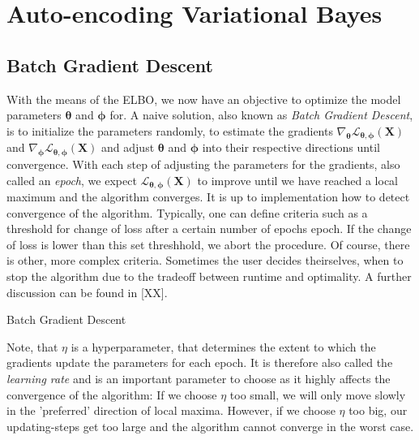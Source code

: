 \documentclass[12pt]{report}
\theoremstyle{definition}
\begin{document}
\section{Auto-encoding Variational Bayes}
\subsection{Batch Gradient Descent}
With the means of the ELBO, we now have an objective to optimize the model parameters $\pmb{\theta}$ and $\pmb{\phi}$ for. A naive solution, also known as \emph{Batch Gradient Descent}, is to initialize the parameters randomly, to estimate the gradients $\nabla_{\pmb{\theta}}\mathcal{L}_{\pmb{\theta}, \pmb{\phi}}(\mathbf{X})$ and $\nabla_{\pmb{\pmb{\phi}}}\mathcal{L}_{\pmb{\theta}, \pmb{\phi}}(\mathbf{X})$ and adjust $\pmb{\theta}$ and $\pmb{\phi}$ into their respective directions until convergence. With each step of adjusting the parameters for the gradients, also called an \emph{epoch}, we expect $\mathcal{L}_{\pmb{\theta}, \pmb{\phi}}(\mathbf{X})$ to improve until we have reached a local maximum and the algorithm converges. It is up to implementation how to detect convergence of the algorithm. Typically, one can define criteria such as a threshold for change of loss after a certain number of epochs epoch. If the change of loss is lower than this set threshhold, we abort the procedure. Of course, there is other, more complex criteria. Sometimes the user decides theirselves, when to stop the algorithm due to the tradeoff between runtime and optimality. A further discussion can be found in [XX].
\begin{algorithm}[H]
\SetAlgoLined
{}
\caption{Batch Gradient Descent}
\end{algorithm} 
Note, that $\eta$ is a hyperparameter, that determines the extent to which the gradients update the parameters for each epoch. It is therefore also called the \emph{learning rate} and is an important parameter to choose as it highly affects the convergence of the algorithm: If we choose $\eta$ too small, we will only move slowly in the 'preferred' direction of local maxima. However, if we choose $\eta$ too big, our updating-steps get too large and the algorithm cannot converge in the worst case. 
\end{document}
